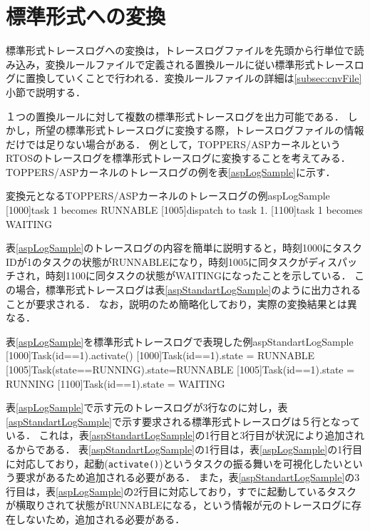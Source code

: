 \section{標準形式への変換}

標準形式トレースログへの変換は，トレースログファイルを先頭から行単位で読み込み，変換ルールファイルで定義される置換ルールに従い標準形式トレースログに置換していくことで行われる．変換ルールファイルの詳細は\ref{subsec:cnvFile}小節で説明する．

１つの置換ルールに対して複数の標準形式トレースログを出力可能である．
しかし，所望の標準形式トレースログに変換する際，トレースログファイルの情報だけでは足りない場合がある．
例として，TOPPERS/ASPカーネル\cite{TOPPERS}というRTOSのトレースログを標準形式トレースログに変換することを考えてみる．
TOPPERS/ASPカーネルのトレースログの例を表\ref{aspLogSample}に示す．

\begin{File}{変換元となるTOPPERS/ASPカーネルのトレースログの例}{aspLogSample}
[1000]task 1 becomes RUNNABLE
[1005]dispatch to task 1.
[1100]task 1 becomes WAITING
\end{File}

表\ref{aspLogSample}のトレースログの内容を簡単に説明すると，時刻1000にタスクIDが1のタスクの状態がRUNNABLEになり，時刻1005に同タスクがディスパッチされ，時刻1100に同タスクの状態がWAITINGになったことを示している．
この場合，標準形式トレースログは表\ref{aspStandartLogSample}のように出力されることが要求される．
なお，説明のため簡略化しており，実際の変換結果とは異なる．

\begin{File}{表\ref{aspLogSample}を標準形式トレースログで表現した例}{aspStandartLogSample}
[1000]Task(id==1).activate()
[1000]Task(id==1).state = RUNNABLE
[1005]Task(state==RUNNING).state=RUNNABLE
[1005]Task(id==1).state = RUNNING
[1100]Task(id==1).state = WAITING
\end{File}

表\ref{aspLogSample}で示す元のトレースログが3行なのに対し，表\ref{aspStandartLogSample}で示す要求される標準形式トレースログは５行となっている．
これは，表\ref{aspStandartLogSample}の1行目と3行目が状況により追加されるからである．
表\ref{aspStandartLogSample}の1行目は，表\ref{aspLogSample}の1行目に対応しており，起動(\verb|activate()|)というタスクの振る舞いを可視化したいという要求があるため追加される必要がある．
また，表\ref{aspStandartLogSample}の3行目は，表\ref{aspLogSample}の2行目に対応しており，すでに起動しているタスクが横取りされて状態がRUNNABLEになる，という情報が元のトレースログに存在しないため，追加される必要がある．

